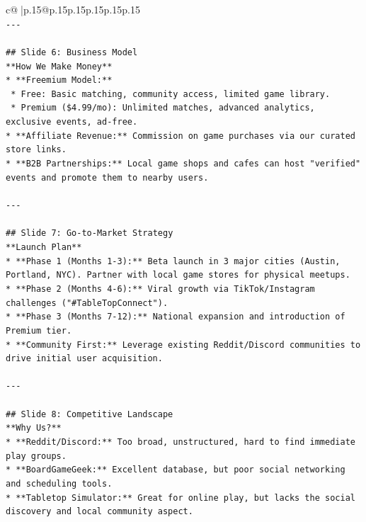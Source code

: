 \documentclass{article}
\begin{document}
{\begin{supertabular}{c@{$\;$}|p{.15\linewidth}@{}p{.15\linewidth}p{.15\linewidth}p{.15\linewidth}p{.15\linewidth}p{.15\linewidth}}
{{{\\ 
\texttt{{-}{-}{-}} \\
\\ 
\texttt{\#\# Slide 6: Business Model} \\
\texttt{**How We Make Money**} \\
\texttt{*   **Freemium Model:**} \\
\texttt{    *   Free: Basic matching, community access, limited game library.} \\
\texttt{    *   Premium (\$4.99/mo): Unlimited matches, advanced analytics, exclusive events, ad{-}free.} \\
\texttt{*   **Affiliate Revenue:** Commission on game purchases via our curated store links.} \\
\texttt{*   **B2B Partnerships:** Local game shops and cafes can host "verified" events and promote them to nearby users.} \\
\\ 
\texttt{{-}{-}{-}} \\
\\ 
\texttt{\#\# Slide 7: Go{-}to{-}Market Strategy} \\
\texttt{**Launch Plan**} \\
\texttt{*   **Phase 1 (Months 1{-}3):** Beta launch in 3 major cities (Austin, Portland, NYC). Partner with local game stores for physical meetups.} \\
\texttt{*   **Phase 2 (Months 4{-}6):** Viral growth via TikTok/Instagram challenges ("\#TableTopConnect").} \\
\texttt{*   **Phase 3 (Months 7{-}12):** National expansion and introduction of Premium tier.} \\
\texttt{*   **Community First:** Leverage existing Reddit/Discord communities to drive initial user acquisition.} \\
\\ 
\texttt{{-}{-}{-}} \\
\\ 
\texttt{\#\# Slide 8: Competitive Landscape} \\
\texttt{**Why Us?**} \\
\texttt{*   **Reddit/Discord:** Too broad, unstructured, hard to find immediate play groups.} \\
\texttt{*   **BoardGameGeek:** Excellent database, but poor social networking and scheduling tools.} \\
\texttt{*   **Tabletop Simulator:** Great for online play, but lacks the social discovery and local community aspect.} \\
}}}
\end{supertabular}}
\end{document}
